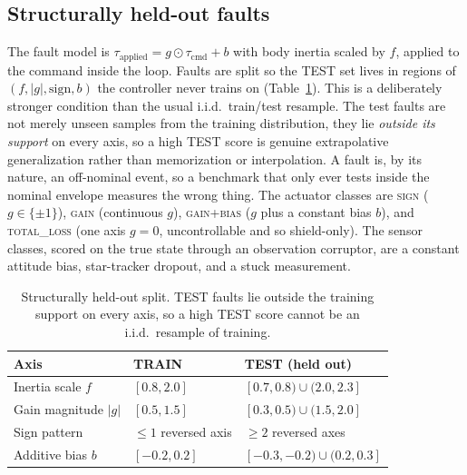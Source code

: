 \documentclass[11pt]{article}
\begin{document}
\subsection{Structurally held-out faults} The fault model is
$\tau_{\mathrm{applied}} = g\odot\tau_{\mathrm{cmd}} + b$ with body inertia scaled by $f$, applied to
the command inside the loop. Faults are split so the TEST set lives in regions of
$(f,|g|,\text{sign},b)$ the controller never trains on (Table~\ref{tab:split}). This is a deliberately
stronger condition than the usual i.i.d.\ train/test resample. The test faults are not merely unseen
samples from the training distribution, they lie \emph{outside its support} on every axis, so a high
TEST score is genuine extrapolative generalization rather than memorization or interpolation. A fault
is, by its nature, an off-nominal event, so a benchmark that only ever tests inside the nominal
envelope measures the wrong thing. The actuator classes are \textsc{sign} ($g\in\{\pm1\}$),
\textsc{gain} (continuous $g$), \textsc{gain+bias} ($g$ plus a constant bias $b$), and
\textsc{total\_loss} (one axis $g{=}0$, uncontrollable and so shield-only). The sensor classes, scored
on the true state through an observation corruptor, are a constant attitude bias, star-tracker
dropout, and a stuck measurement.

\begin{table}[h]\centering\small
\caption{Structurally held-out split. TEST faults lie outside the training support on every axis,
so a high TEST score cannot be an i.i.d.\ resample of training.}
\label{tab:split}
\begin{tabular}{lll}
\toprule
Axis & TRAIN & TEST (held out) \\
\midrule
Inertia scale $f$    & $[0.8, 2.0]$       & $[0.7,0.8)\cup(2.0,2.3]$ \\
Gain magnitude $|g|$ & $[0.5, 1.5]$       & $[0.3,0.5)\cup(1.5,2.0]$ \\
Sign pattern         & $\leq 1$ reversed axis & $\geq 2$ reversed axes \\
Additive bias $b$    & $[-0.2, 0.2]$      & $[-0.3,-0.2)\cup(0.2,0.3]$ \\
\bottomrule
\end{tabular}
\end{table}
\end{document}
